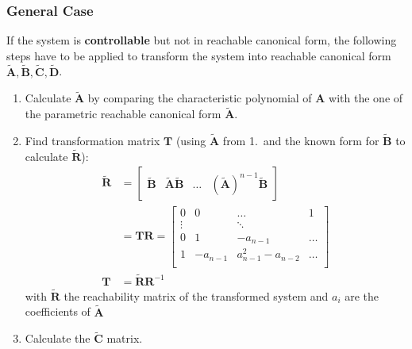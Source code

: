 \subsubsection{General Case}
If the system is \textbf{controllable} but not in reachable canonical form, the following steps have to be applied to transform the system into reachable canonical form $\tilde{\mathbf{A}},\tilde{\mathbf{B}},\tilde{\mathbf{C}},\tilde{\mathbf{D}}$.
\begin{enumerate}
    \item Calculate $\tilde{\mathbf{A}}$ by comparing the characteristic polynomial of $\mathbf{A}$ with the one of the parametric reachable canonical form $\tilde{\mathbf{A}}$.
    \item Find transformation matrix $\mathbf{T}$ (using $\tilde{\mathbf{A}}$ from 1.\ and the known form for $\tilde{\mathbf{B}}$ to calculate $\tilde{\mathbf{R}}$):
          \noindent\begin{align*}
              \tilde{\mathbf{R}} & =\begin{bmatrix}
                                        \tilde{\mathbf{B}} & \tilde{\mathbf{A}}\tilde{\mathbf{B}} & \ldots & {(\tilde{\mathbf{A}})}^{n-1}\tilde{\mathbf{B}}
                                    \end{bmatrix} \\
                                 & =\mathbf{TR}  =\begin{bmatrix}
                                                      0      & 0        & \dots               & 1     \\
                                                      \vdots &          & \ddots              &       \\
                                                      0      & 1        & -a_{n-1}            & \dots \\
                                                      1      & -a_{n-1} & a_{n-1}^2 - a_{n-2} & \dots \\
                                                  \end{bmatrix}                                                                                                           \\
              \mathbf{T}         & = \tilde{\mathbf{R}}\mathbf{R}^{-1}
          \end{align*}
          with $\tilde{\mathbf{R}}$ the reachability matrix of the transformed system and $a_i$ are the coefficients of $\tilde{\mathbf{A}}$
    \item Calculate the $\tilde{\mathbf{C}}$ matrix.

\end{enumerate}
